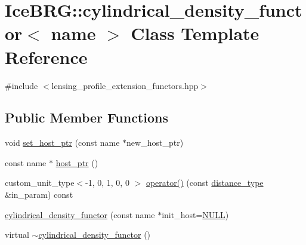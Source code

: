 \hypertarget{classIceBRG_1_1cylindrical__density__functor}{\section{Ice\-B\-R\-G\-:\-:cylindrical\-\_\-density\-\_\-functor$<$ name $>$ Class Template Reference}
\label{classIceBRG_1_1cylindrical__density__functor}
}


{\ttfamily \#include $<$lensing\-\_\-profile\-\_\-extension\-\_\-functors.\-hpp$>$}

\subsection*{Public Member Functions}
\begin{DoxyCompactItemize}
\item 
void \hyperlink{classIceBRG_1_1cylindrical__density__functor_a599f26f17d250c82adfb88e1fbdfabff}{set\-\_\-host\-\_\-ptr} (const name $\ast$new\-\_\-host\-\_\-ptr)
\item 
const name $\ast$ \hyperlink{classIceBRG_1_1cylindrical__density__functor_a40f0ba02764d0749cc7dcdd3d2673b0a}{host\-\_\-ptr} ()
\item 
custom\-\_\-unit\-\_\-type$<$-\/1, 0, 1, 0, 0 $>$ \hyperlink{classIceBRG_1_1cylindrical__density__functor_ab86926c7bd917d867d105fe5d8d79506}{operator()} (const \hyperlink{namespaceIceBRG_a45499647eb87e24c10ab32c628711cec}{distance\-\_\-type} \&in\-\_\-param) const 
\item 
\hyperlink{classIceBRG_1_1cylindrical__density__functor_a9f32a3aa13fbadc314dbf36fa870ea65}{cylindrical\-\_\-density\-\_\-functor} (const name $\ast$init\-\_\-host=\hyperlink{lib_2IceBRG__main_2common_8h_a070d2ce7b6bb7e5c05602aa8c308d0c4}{N\-U\-L\-L})
\item 
virtual \hyperlink{classIceBRG_1_1cylindrical__density__functor_a5c0d681ec3253c39576f5645b05d8205}{$\sim$cylindrical\-\_\-density\-\_\-functor} ()
\end{DoxyCompactItemize}


